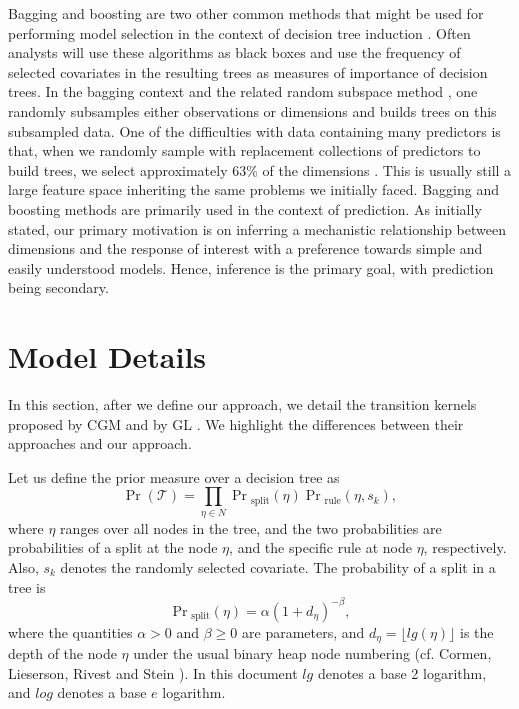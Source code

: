 Bagging and boosting are two other common methods that might be used for performing model selection in the context of decision tree induction \cite{breiman1996bagging} \cite{freund1999short}. Often analysts will use these algorithms as black boxes and use the frequency of selected covariates in the resulting trees as measures of importance of decision trees. In the bagging context and the related random subspace method \cite{ho1998random}, one randomly subsamples either observations or dimensions and builds trees on this subsampled data. One of the difficulties with data containing many predictors is that, when we randomly sample with replacement collections of predictors to build trees, we select approximately 63\% of the dimensions \cite{efron1997improvements}. This is usually still a large feature space inheriting the same problems we initially faced. %
 Bagging and boosting methods are primarily used in the context of prediction. As initially stated, our primary motivation is on inferring a mechanistic relationship between dimensions and the response of interest with a preference towards simple and easily understood models. Hence, inference is the primary goal, with prediction being secondary. 

\section{Model Details}\label{sec:model_details}

In this section, after we define our approach, we detail the transition kernels proposed by CGM \cite{chipman1998bayesian} and by GL \cite{gramacy2008bayesian}. We highlight the differences between their approaches and our approach. 

Let us define the prior measure over a decision tree as
\begin{equation} 
\Pr(\mathcal{T}) = \prod_{\eta\in N} \Pr{_{\text{split}}} (\eta) \Pr{_{\text{rule}}}(\eta,s_k),\nonumber
\end{equation}
where $\eta$ ranges over all nodes in the tree, and the two probabilities are probabilities of a split at the node $\eta$, and the specific rule at node $\eta$, respectively. Also, $s_k$ denotes the randomly selected covariate. The probability of a split in a tree is 
 \begin{equation}
 \Pr{_\text{split}}(\eta)= \alpha(1+d_\eta)^{-\beta},\nonumber
 \end{equation}
where the quantities $\alpha>0$ and $\beta\geq0$ are parameters, and $d_\eta = \lfloor lg(\eta)\rfloor$ is the depth of the node $\eta$ under the usual binary heap node numbering (cf. Cormen, Lieserson, Rivest and Stein \cite{cormen2001introduction}). In this document $lg$ denotes a base 2 logarithm, and $log$ denotes a base $e$ logarithm. 
  
